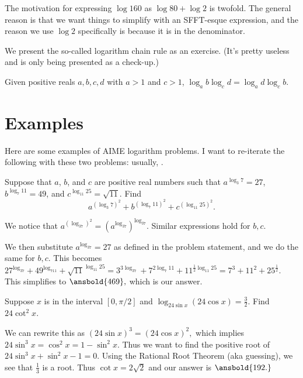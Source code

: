 The motivation for expressing $\log 160$ as $\log 80 + \log 2$ is twofold. The general reason is that we want things to simplify with an SFFT-esque expression, and the reason we use $\log 2$ specifically is because it is in the denominator.

We present the so-called logarithm chain rule as an exercise. (It's pretty useless and is only being presented as a check-up.)

\begin{exer}
Given positive reals $a,b,c,d$ with $a>1$ and $c>1$, $\log_{a}b\log_{c}d=\log_{a}d\log_{c}b.$
\end{exer}

\section{Examples}
Here are some examples of AIME logarithm problems. I want to re-iterate the following with these two problems: usually, .

\begin{exam}[AIME II 2009/2]
Suppose that $a$, $b$, and $c$ are positive real numbers such that $a^{\log_3 7} = 27$, $b^{\log_7 11} = 49$, and $c^{\log_{11}25} = \sqrt{11}$. Find
\[a^{(\log_3 7)^2} + b^{(\log_7 11)^2} + c^{(\log_{11} 25)^2}.\]
\end{exam}

\begin{sol} We notice that $a^{(\log_37)^2}=(a^{\log_37})^{\log_37}.$ Similar expressions hold for $b,c.$

We then substitute $a^{\log_37}=27$ as defined in the problem statement, and we do the same for $b,c$. This becomes $27^{\log_37}+49^{\log_711}+\sqrt{11}^{\log_{11}25}=3^{3\log_37}+7^{2\log_7{11}}+11^{\frac{1}{2}\log_{11}25}=7^3+11^2+25^{\frac{1}{2}}.$ This simplifies to $\ansbold{469},$ which is our answer.\end{sol}

\begin{exam}[AIME I 2011/9]
Suppose $x$ is in the interval $[0, \pi/2]$ and $\log_{24\sin x} (24\cos x)=\frac{3}{2}$. Find $24\cot^2 x$.
\end{exam}

\begin{sol}
We can rewrite this as $(24\sin x)^3=(24\cos x)^2,$ which implies $24\sin^3 x=\cos^2 x=1-\sin^2 x.$ Thus we want to find the positive root of $24\sin^3 x+\sin^2 x-1=0.$ Using the Rational Root Theorem (aka guessing), we see that $\frac{1}{3}$ is a root. Thus $\cot x=2\sqrt{2}$ and our answer is $\ansbold{192.}$\end{sol}
